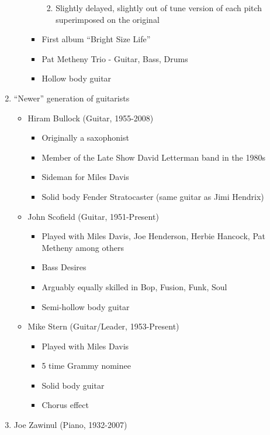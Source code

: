 \documentclass[]{article}
\providecommand{\tightlist}{%
  \setlength{\itemsep}{0pt}\setlength{\parskip}{0pt}}
\begin{document}
\begin{enumerate}
\begin{itemize}
\begin{itemize}
      \begin{enumerate}
      \def\labelenumii{\roman{enumii}.}
      \tightlist
      \item
        Slightly delayed, slightly out of tune version of each pitch
        superimposed on the original
      \end{enumerate}
    \item
      First album ``Bright Size Life''
    \item
      Pat Metheny Trio - Guitar, Bass, Drums
    \item
      Hollow body guitar
    \end{itemize}
  \end{itemize}
\item
  ``Newer'' generation of guitarists

  \begin{itemize}
  \tightlist
  \item
    Hiram Bullock (Guitar, 1955-2008)

    \begin{itemize}
    \tightlist
    \item
      Originally a saxophonist
    \item
      Member of the Late Show David Letterman band in the 1980s
    \item
      Sideman for Miles Davis
    \item
      Solid body Fender Stratocaster (same guitar as Jimi Hendrix)
    \end{itemize}
  \item
    John Scofield (Guitar, 1951-Present)

    \begin{itemize}
    \tightlist
    \item
      Played with Miles Davis, Joe Henderson, Herbie Hancock, Pat
      Metheny among others
    \item
      Bass Desires
    \item
      Arguably equally skilled in Bop, Fusion, Funk, Soul
    \item
      Semi-hollow body guitar
    \end{itemize}
  \item
    Mike Stern (Guitar/Leader, 1953-Present)

    \begin{itemize}
    \tightlist
    \item
      Played with Miles Davis
    \item
      5 time Grammy nominee
    \item
      Solid body guitar
    \item
      Chorus effect
    \end{itemize}
  \end{itemize}
\item
  Joe Zawinul (Piano, 1932-2007)


\end{enumerate}
\end{document}
